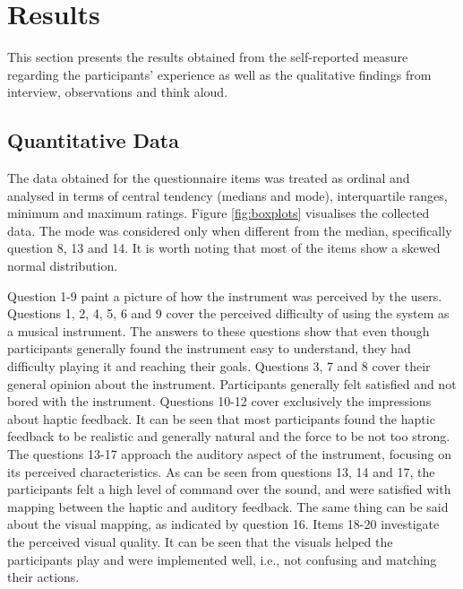 \section{Results}\label{sec:results}
This section presents the results obtained from the self-reported measure regarding the participants' experience as well as the qualitative findings from interview, observations and think aloud.

\subsection{Quantitative Data}
The data obtained for the questionnaire items was treated as ordinal and analysed in terms of central tendency (medians and mode), interquartile ranges, minimum and maximum ratings. Figure \ref{fig:boxplots} visualises the collected data. The mode was considered only when different from the median, specifically question 8, 13 and 14. It is worth noting that most of the items show a skewed normal distribution.

Question 1-9 paint a picture of how the instrument was perceived by the users. Questions 1, 2, 4, 5, 6 and 9 cover the perceived difficulty of using the system as a musical instrument. The answers to these questions show that even though participants generally found the instrument easy to understand, they had difficulty playing it and reaching their goals.
Questions 3, 7 and 8 cover their general opinion about the instrument. Participants generally felt satisfied and not bored with the instrument.
Questions 10-12 cover exclusively the impressions about haptic feedback. It can be seen that most participants found the haptic feedback to be realistic and generally natural and the force to be not too strong.
The questions 13-17 approach the auditory aspect of the instrument, focusing on its perceived characteristics. As can be seen from questions 13, 14 and 17, the participants felt a high level of command over the sound, and were satisfied with mapping between the haptic and auditory feedback. The same thing can be said about the visual mapping, as indicated by question 16. 
Items 18-20 investigate the perceived visual quality. It can be seen that the visuals helped the participants play and were implemented well, i.e., not confusing and matching their actions.

